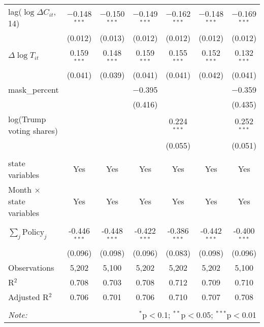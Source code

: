 \begin{tabular}{@{\extracolsep{1pt}}lcccccc}
  lag($\log \Delta C_{it}$, 14) & $-$0.148$^{***}$ & $-$0.150$^{***}$ & $-$0.149$^{***}$ & $-$0.162$^{***}$ & $-$0.148$^{***}$ & $-$0.169$^{***}$ \\ 
  & (0.012) & (0.013) & (0.012) & (0.012) & (0.012) & (0.012) \\ 
  $\Delta \log T_{it}$ & 0.159$^{***}$ & 0.148$^{***}$ & 0.159$^{***}$ & 0.155$^{***}$ & 0.152$^{***}$ & 0.132$^{***}$ \\ 
  & (0.041) & (0.039) & (0.041) & (0.041) & (0.042) & (0.041) \\ 
  mask\_percent &  &  & $-$0.395 &  &  & $-$0.359 \\ 
  &  &  & (0.416) &  &  & (0.435) \\ 
  log(Trump voting shares) &  &  &  & 0.224$^{***}$ &  & 0.252$^{***}$ \\ 
  &  &  &  & (0.055) &  & (0.051) \\ 
 \hline \\[-1.8ex] 
state variables & Yes & Yes & Yes & Yes & Yes & Yes \\ 
Month $\times$ state variables & Yes & Yes & Yes & Yes & Yes & Yes \\ 
\hline \\[-1.8ex] 
$\sum_j \mathrm{Policy}_j$ & -0.446$^{***}$ & -0.448$^{***}$ & -0.422$^{***}$ & -0.386$^{***}$ & -0.442$^{***}$ & -0.400$^{***}$ \\ 
 & (0.096) & (0.098) & (0.096) & (0.083) & (0.098) & (0.096) \\ 
Observations & 5,202 & 5,100 & 5,202 & 5,202 & 5,202 & 5,100 \\ 
R$^{2}$ & 0.708 & 0.703 & 0.708 & 0.712 & 0.709 & 0.710 \\ 
Adjusted R$^{2}$ & 0.706 & 0.701 & 0.706 & 0.710 & 0.707 & 0.708 \\ 
\hline 
\hline \\[-1.8ex] 
\textit{Note:}  & \multicolumn{6}{r}{$^{*}$p$<$0.1; $^{**}$p$<$0.05; $^{***}$p$<$0.01} \\ 
\end{tabular} 